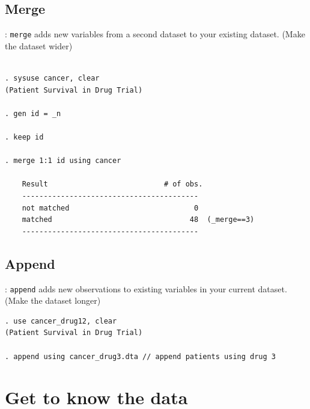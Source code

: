 \subsection{Merge}
\begin{frame}[fragile]{\secname : \subsecname}
\verb|merge| adds new variables from a second dataset to your existing dataset.
(Make the dataset wider)\\[4mm]
\small
\begin{verbatim}

. sysuse cancer, clear
(Patient Survival in Drug Trial)

. gen id = _n 

. keep id

. merge 1:1 id using cancer 

    Result                           # of obs.
    -----------------------------------------
    not matched                             0
    matched                                48  (_merge==3)
    -----------------------------------------

\end{verbatim}
\end{frame}

\subsection{Append}
\begin{frame}[fragile]{\secname : \subsecname}
\verb|append| adds new observations to existing variables in your current dataset. \\ (Make the dataset longer) \\[4mm]
\small
\begin{verbatim}
. use cancer_drug12, clear 
(Patient Survival in Drug Trial)

. append using cancer_drug3.dta // append patients using drug 3
\end{verbatim}
\end{frame}


\section{Get to know the data}
